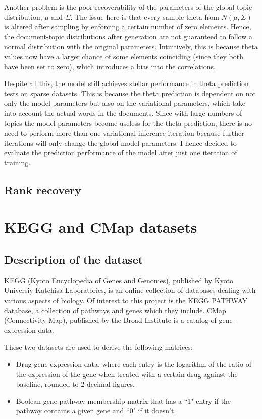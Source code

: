 \documentclass[12pt,a4paper,twoside,openright]{report}
\begin{document}
Another problem is the poor recoverability of the parameters of the global topic distribution, $\mu$ and $\Sigma$. The issue here is that every sample theta from $N(\mu, \Sigma)$ is altered after sampling by enforcing a certain number of zero elements. Hence, the document-topic distributions after generation are not guaranteed to follow a normal distribution with the original parameters. Intuitively, this is because theta values now have a larger chance of some elements coinciding (since they both have been set to zero), which introduces a bias into the correlations.

Despite all this, the model still achieves stellar performance in theta prediction tests on sparse datasets. This is because the theta prediction is dependent on not only the model parameters but also on the variational parameters, which take into account the actual words in the documents. Since with large numbers of topics the model parameters become useless for the theta prediction, there is no need to perform more than one variational inference iteration because further iterations will only change the global model parameters. I hence decided to evaluate the prediction performance of the model after just one iteration of training.

\subsection{Rank recovery}

\section{KEGG and CMap datasets}

\subsection{Description of the dataset}

KEGG (Kyoto Encyclopedia of Genes and Genomes), published by Kyoto Universiy Katehisa Laboratories, is an online collection of databases dealing with various aspects of biology. Of interest to this project is the KEGG PATHWAY database, a collection of pathways and genes which they include. CMap (Connectivity Map), published by the Broad Institute is a catalog of gene-expression data.

These two datasets are used to derive the following matrices:

\begin{itemize}[noitemsep]
\item Drug-gene expression data, where each entry is the logarithm of the ratio of the expression of the gene when treated with a certain drug against the baseline, rounded to 2 decimal figures.
\item Boolean gene-pathway membership matrix that has a ``1" entry if the pathway contains a given gene and ``0" if it doesn't.
\end{itemize}
\end{document}
